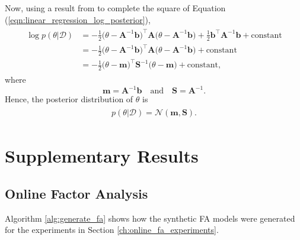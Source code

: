 \documentclass[msc,deptreport.inf]{infthesis} %
\newcommand{\matr}[1]{\mathbf{#1}}
\begin{document}
Now, using a result from \cite{barber2007} to complete the square of Equation (\ref{eqn:linear_regression_log_posterior}),
\begin{align}
\begin{split}
	\log p(\theta | \mathcal{D}) 
	& = -\frac{1}{2} \big(\theta - \matr{A}^{-1} \matr{b} \big)^\intercal \matr{A} \big(\theta - \matr{A}^{-1} \matr{b} \big)
	+ \frac{1}{2} \matr{b}^\intercal \matr{A}^{-1} \matr{b}
	+ \text{constant} \\
	& = -\frac{1}{2} \big(\theta - \matr{A}^{-1} \matr{b} \big)^\intercal \matr{A} \big(\theta - \matr{A}^{-1} \matr{b} \big)
	+ \text{constant} \\
	& = -\frac{1}{2} \big(\theta - \matr{m} \big)^\intercal \matr{S}^{-1} \big(\theta - \matr{m} \big)
	+ \text{constant},
\end{split}
\end{align}
where
\begin{equation}
	\matr{m} = \matr{A}^{-1} \matr{b}
	\quad \text{and} \quad 
	\matr{S} = \matr{A}^{-1}.
\end{equation}
Hence, the posterior distribution of $\theta$ is 
\begin{align}
\begin{split}
	p(\theta | \mathcal{D}) = \mathcal{N}(\matr{m}, \matr{S}).
\end{split}
\end{align}


 \chapter{Supplementary Results}
 
 \section{Online Factor Analysis}\label{app:online_fa}
 
Algorithm \ref{alg:generate_fa} shows how the synthetic FA models were generated for the experiments in Section \ref{ch:online_fa_experiments}.
 
\end{document}
